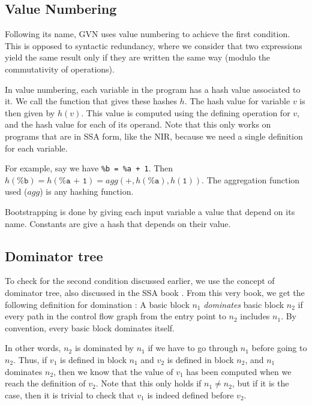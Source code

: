 \documentclass[12pt,a4paper]{article}
\newcommand{\nir}[1]{\texttt{#1}}
\begin{document}
\subsection{Value Numbering}

Following its name, GVN uses value numbering to achieve the first condition. This is opposed to syntactic redundancy, where we consider that two expressions yield the same result only if they are written the same way (modulo the commutativity of operations).

In value numbering, each variable in the program has a hash value associated to it. We call the function that gives these hashes $h$. The hash value for variable $v$ is then given by $h(v)$. This value is computed using the defining operation for $v$, and the hash value for each of its operand. Note that this only works on programs that are in SSA form, like the NIR, because we need a single definition for each variable.

For example, say we have \nir{\%b = \%a + 1}. Then $h(\nir{\%b}) = h(\nir{\%a + 1}) = agg(\nir{+}, h(\nir{\%a}), h(\nir{1}))$. The aggregation function used ($agg$) is any hashing function.

Bootstrapping is done by giving each input variable a value that depend on its name. Constants are give a hash that depends on their value.

\subsection{Dominator tree}

To check for the second condition discussed earlier, we use the concept of dominator tree, also discussed in the SSA book \cite{ssabook}. From this very book, we get the following definition for domination :
\newline
A basic block $n_1$ \textit{dominates} basic block $n_2$ if every path in the control flow graph from the entry point to $n_2$ includes $n_1$. By convention, every basic block dominates itself.

In other words, $n_2$ is dominated by $n_1$ if we have to go through $n_1$ before going to $n_2$. Thus, if $v_1$ is defined in block $n_1$ and $v_2$ is defined in block $n_2$, and $n_1$ dominates $n_2$, then we know that the value of $v_1$ has been computed when we reach the definition of $v_2$. Note that this only holds if $n_1 \neq n_2$, but if it is the case, then it is trivial to check that $v_1$ is indeed defined before $v_2$.
\end{document}
